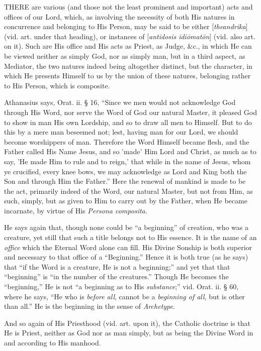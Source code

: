 
THERE
are various (and those not the least prominent and important) acts and
offices of our Lord, which, as involving the necessity of both His
natures in concurrence and belonging to His Person, may be said to be
either [\emph{theandrika}] (vid. art. under that heading), or
instances of [\emph{antidosis idi\={o}mat\={o}n}] (vid. also
art. on it). Such are His office and His acts as Priest, as Judge,
\&c., in which He can be viewed neither as simply God, nor as
simply man, but in a third aspect, as Mediator, the two natures indeed
being altogether distinct, but the character, in which He presents
Himself to us by the union of these natures, belonging rather to His
Person, which is composite.

Athanasius
says, Orat. ii. § 16, ``Since we men would not acknowledge God through
His Word, nor serve the Word of God our natural Master, it pleased God
to show in man His own Lordship, and so to draw all men to Himself.
But to do this by a mere man beseemed not; lest, having man for our
Lord, we should become worshippers of man. Therefore the Word Himself
became flesh, and the Father called His Name Jesus, and so 'made' Him
Lord and Christ, as much as to say, 'He made Him to rule and to
reign,' that while in the name of Jesus, whom ye crucified,
every knee bows, we may acknowledge as Lord and King both the Son and
through Him the Father.'' Here the renewal of mankind is made to be the
act, primarily indeed of the Word, our natural Master, but not from
Him, as such, simply, but as given to Him to carry out by the Father,
when He became incarnate, by virtue of His \emph{Persona composita}.

He
says again that, though none could be ``a beginning'' of creation, who
was a creature, yet still that such a title belongs not to His
essence. It is the name of an \emph{office} which the Eternal Word
alone can fill. His Divine Sonship is both superior and necessary to
that office of a ``Beginning.'' Hence it is both true (as he says) that ``if
the Word is a creature, He is not a beginning;'' and yet that that ``beginning''
is ``in the number of the creatures.'' Though He becomes the ``beginning,''
He is not ``a beginning as to His \emph{substance};'' vid. Orat. ii. §
60, where he says, ``He who is \emph{before all}, cannot be a \emph{beginning
of all}, but is other than all.'' He is the beginning in the sense
of \emph{Archetype}.

And
so again of His Priesthood (vid. art. upon it), the Catholic doctrine
is that He is Priest, neither as God nor as man simply, but as being
the Divine Word in and according to His manhood.

